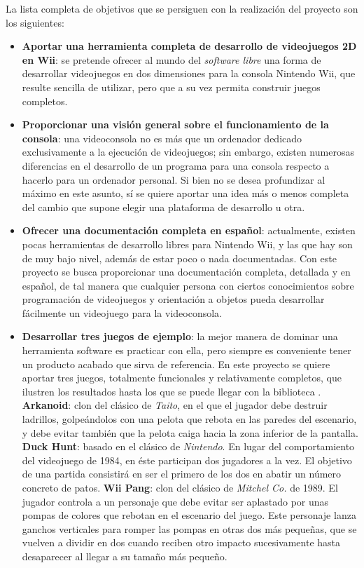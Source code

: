 La lista completa de objetivos que se persiguen con la realización del proyecto son los siguientes:

\begin{itemize}
\item \textbf{Aportar una herramienta completa de desarrollo de videojuegos 2D en Wii}: se pretende ofrecer al mundo del \emph{software libre} una forma de desarrollar videojuegos en dos dimensiones para la consola Nintendo Wii, que resulte sencilla de utilizar, pero que a su vez permita construir juegos completos.
\item \textbf{Proporcionar una visión general sobre el funcionamiento de la consola}: una videoconsola no es más que un ordenador dedicado exclusivamente a la ejecución de videojuegos; sin embargo, existen numerosas diferencias en el desarrollo de un programa para una consola respecto a hacerlo para un ordenador personal. Si bien no se desea profundizar al máximo en este asunto, sí se quiere aportar una idea más o menos completa del cambio que supone elegir una plataforma de desarrollo u otra.
\item \textbf{Ofrecer una documentación completa en español}: actualmente, existen pocas herramientas de desarrollo libres para Nintendo Wii, y las que hay son de muy bajo nivel, además de estar poco o nada documentadas. Con este proyecto se busca proporcionar una documentación completa, detallada y en español, de tal manera que cualquier persona con ciertos conocimientos sobre programación de videojuegos y orientación a objetos pueda desarrollar fácilmente un videojuego para la videoconsola.
\item \textbf{Desarrollar tres juegos de ejemplo}: la mejor manera de dominar una herramienta software es practicar con ella, pero siempre es conveniente tener un producto acabado que sirva de referencia. En este proyecto se quiere aportar tres juegos, totalmente funcionales y relativamente completos, que ilustren los resultados hasta los que se puede llegar con la biblioteca .
\subitem \textbf{Arkanoid}: clon del clásico de \emph{Taito}, en el que el jugador debe destruir ladrillos, golpeándolos con una pelota que rebota en las paredes del escenario, y debe evitar también que la pelota caiga hacia la zona inferior de la pantalla.
\subitem \textbf{Duck Hunt}: basado en el clásico de \emph{Nintendo}. En lugar del comportamiento del videojuego de 1984, en éste participan dos jugadores a la vez. El objetivo de una partida consistirá en ser el primero de los dos en abatir un número concreto de patos.
\subitem \textbf{Wii Pang}: clon del clásico  de \emph{Mitchel Co.} de 1989. El jugador controla a un personaje que debe evitar ser aplastado por unas pompas de colores que rebotan en el escenario del juego. Este personaje lanza ganchos verticales para romper las pompas en otras dos más pequeñas, que se vuelven a dividir en dos cuando reciben otro impacto sucesivamente hasta desaparecer al llegar a su tamaño más pequeño.
\end{itemize}

